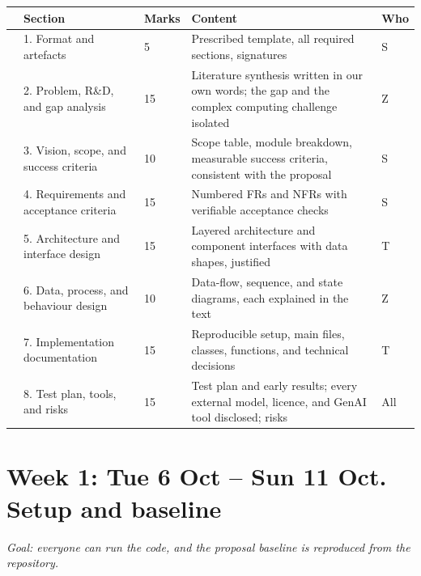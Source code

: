 \documentclass[10pt,a4paper]{article}
\newcounter{cbn}
\newcommand{\cb}{\mbox{\stepcounter{cbn}\CheckBox[name=cb\thecbn,width=9pt,height=9pt,borderwidth=0.8pt,bordercolor=0 0 0,backgroundcolor=1 1 1,checkboxsymbol=\ding{51}]{}}}
\newcommand{\week}[2]{\needspace{9\baselineskip}\section*{#1}\vspace{-6pt}\textit{Goal: #2}\par}
\begin{document}
\begin{Form}
\begin{longtable}{@{}p{6mm}p{52mm}p{11mm}p{82mm}p{9mm}@{}}
\toprule
 & Section & Marks & Content & Who \\
\midrule
\endhead
\cb & 1. Format and artefacts & 5 & Prescribed template, all required sections, signatures & S \\
\cb & 2. Problem, R\&D, and gap analysis & 15 & Literature synthesis written in our own words; the gap and the complex computing challenge isolated & Z \\
\cb & 3. Vision, scope, and success criteria & 10 & Scope table, module breakdown, measurable success criteria, consistent with the proposal & S \\
\cb & 4. Requirements and acceptance criteria & 15 & Numbered FRs and NFRs with verifiable acceptance checks & S \\
\cb & 5. Architecture and interface design & 15 & Layered architecture and component interfaces with data shapes, justified & T \\
\cb & 6. Data, process, and behaviour design & 10 & Data-flow, sequence, and state diagrams, each explained in the text & Z \\
\cb & 7. Implementation documentation & 15 & Reproducible setup, main files, classes, functions, and technical decisions & T \\
\cb & 8. Test plan, tools, and risks & 15 & Test plan and early results; every external model, licence, and GenAI tool disclosed; risks & All \\
\bottomrule
\end{longtable}

\newpage
\week{Week 1: Tue 6 Oct -- Sun 11 Oct. Setup and baseline}{everyone can run the code, and the proposal baseline is reproduced from the repository.}


\end{Form}
\end{document}
